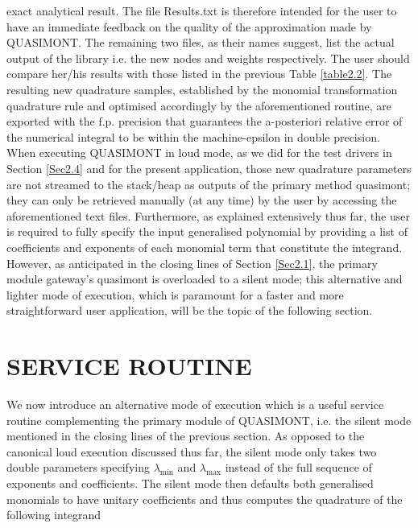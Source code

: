 \documentclass[a4paper, twosided]{book}
\begin{document}
exact analytical result. The file \colorbox{poliGrayBlue}{Results.txt} is therefore intended for the user to have an immediate feedback on the quality of the approximation made by QUASIMONT. The remaining two files, as their names suggest, list the actual output of the library i.e. the new nodes and weights respectively. The user should compare her/his results with those listed in the previous Table \ref{table2.2}. The resulting new quadrature samples, established by the monomial transformation quadrature rule and optimised accordingly by the aforementioned routine, are exported with the f.p. precision that guarantees the a-posteriori relative error of the numerical integral to be within the machine-epsilon in double precision. When executing QUASIMONT in loud mode, as we did for the test drivers in Section \ref{Sec2.4} and for the present application, those new quadrature parameters are not streamed to the stack/heap as outputs of the primary method \colorbox{poliGrayBlue}{quasimont}; they can only be retrieved manually (at any time) by the user by accessing the aforementioned text files. Furthermore, as explained extensively thus far, the user is required to fully specify the input generalised polynomial by providing a list of coefficients and exponents of each monomial term that constitute the integrand. However, as anticipated in the closing lines of Section \ref{Sec2.1}, the primary module gateway's \colorbox{poliGrayBlue}{quasimont} is overloaded to a silent mode; this alternative and lighter mode of execution, which is paramount for a faster and more straightforward user application, will be the topic of the following section.

\section[Service routine]{\changefont SERVICE ROUTINE}\label{Sec3.2.bis}

\noindent
We now introduce an alternative mode of execution which is a useful service routine complementing the primary module of QUASIMONT, i.e. the silent mode mentioned in the closing lines of the previous section. As opposed to the canonical loud execution discussed thus far, the silent mode only takes two \colorbox{poliGrayBlue}{double} parameters specifying $\lambda_{\text{min}}$ and $\lambda_{\text{max}}$ instead of the full sequence of exponents and coefficients. The silent mode then defaults both generalised monomials to have unitary coefficients and thus computes the quadrature of the following integrand 
\end{document}
